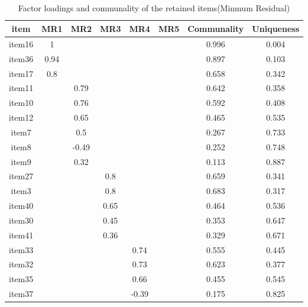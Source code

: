 \clearpage
\makeatletter
\efloat@restorefloats
\makeatother


\begin{appendix}
\section{}
\begin{table}[tbp]

\begin{center}
\begin{threeparttable}

\caption{\label{tab:MinResTab-33}Factor loadings and communality of the retained items(Minmum Residual)}

\small{

\begin{tabular}{cccccccc}
\toprule
item & \multicolumn{1}{c}{MR1} & \multicolumn{1}{c}{MR2} & \multicolumn{1}{c}{MR3} & \multicolumn{1}{c}{MR4} & \multicolumn{1}{c}{MR5} & \multicolumn{1}{c}{Communality} & \multicolumn{1}{c}{Uniqueness}\\
\midrule
item16 & 1 &  &  &  &  & 0.996 & 0.004\\
item36 & 0.94 &  &  &  &  & 0.897 & 0.103\\
item17 & 0.8 &  &  &  &  & 0.658 & 0.342\\
item11 &  & 0.79 &  &  &  & 0.642 & 0.358\\
item10 &  & 0.76 &  &  &  & 0.592 & 0.408\\
item12 &  & 0.65 &  &  &  & 0.465 & 0.535\\
item7 &  & 0.5 &  &  &  & 0.267 & 0.733\\
item8 &  & -0.49 &  &  &  & 0.252 & 0.748\\
item9 &  & 0.32 &  &  &  & 0.113 & 0.887\\
item27 &  &  & 0.8 &  &  & 0.659 & 0.341\\
item3 &  &  & 0.8 &  &  & 0.683 & 0.317\\
item40 &  &  & 0.65 &  &  & 0.464 & 0.536\\
item30 &  &  & 0.45 &  &  & 0.353 & 0.647\\
item41 &  &  & 0.36 &  &  & 0.329 & 0.671\\
item33 &  &  &  & 0.74 &  & 0.555 & 0.445\\
item32 &  &  &  & 0.73 &  & 0.623 & 0.377\\
item35 &  &  &  & 0.66 &  & 0.455 & 0.545\\
item37 &  &  &  & -0.39 &  & 0.175 & 0.825\\

\end{tabular}}
\end{threeparttable}
\end{center}
\end{table}
\end{appendix}
